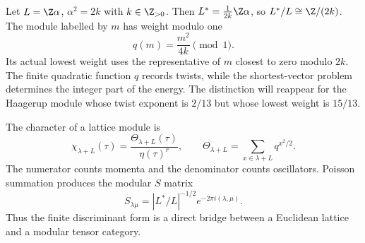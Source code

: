 \begin{example}
Let $L=\Z\alpha$, $\alpha^2=2k$ with $k\in\Z_{>0}$. Then
$L^*=\frac1{2k}\Z\alpha$, so $L^*/L\cong\Z/(2k)$.
The module labelled by $m$ has weight modulo one
\[
 q(m)=\frac{m^2}{4k}\pmod1.
\]
Its actual lowest weight uses the representative of $m$ closest
to zero modulo $2k$. The finite quadratic function $q$ records
twists, while the shortest-vector problem determines the integer
part of the energy. The distinction will reappear for the Haagerup
module whose twist exponent is $2/13$ but whose lowest weight is
$15/13$.
\end{example}

The character of a lattice module is
\begin{equation}
 \chi_{\lambda+L}(\tau)
 =\frac{\Theta_{\lambda+L}(\tau)}{\eta(\tau)^r},
 \qquad
 \Theta_{\lambda+L}=\sum_{x\in\lambda+L}q^{x^2/2}.
 \label{eq:voa-lattice-character}
\end{equation}
The numerator counts momenta and the denominator counts oscillators.
Poisson summation produces the modular $S$ matrix
\[
 S_{\lambda\mu}=|L^*/L|^{-1/2}e^{-2\pi i(\lambda,\mu)}.
\]
Thus the finite discriminant form is a direct bridge between a
Euclidean lattice and a modular tensor category.

